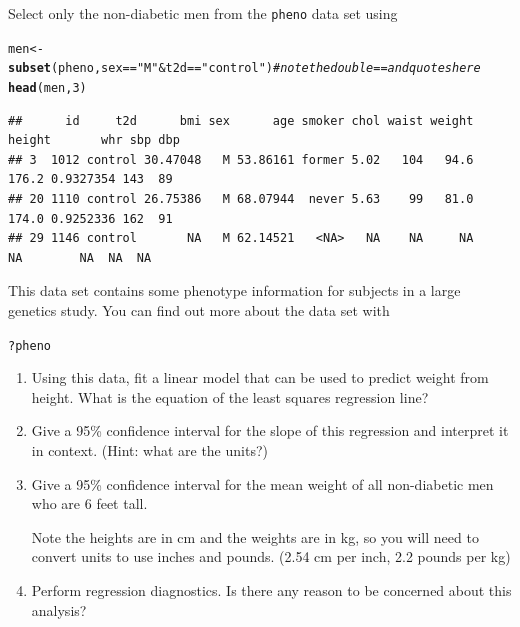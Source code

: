 \documentclass[twoside]{book}\usepackage[]{graphicx}\usepackage[]{xcolor}
\makeatletter
\newcommand{\hlnum}[1]{\textcolor[rgb]{0.686,0.059,0.569}{#1}}%
\newcommand{\hlstr}[1]{\textcolor[rgb]{0.192,0.494,0.8}{#1}}%
\newcommand{\hlcom}[1]{\textcolor[rgb]{0.678,0.584,0.686}{\textit{#1}}}%
\newcommand{\hlopt}[1]{\textcolor[rgb]{0,0,0}{#1}}%
\newcommand{\hlstd}[1]{\textcolor[rgb]{0.345,0.345,0.345}{#1}}%
\newcommand{\hlkwb}[1]{\textcolor[rgb]{0.69,0.353,0.396}{#1}}%
\newcommand{\hlkwd}[1]{\textcolor[rgb]{0.737,0.353,0.396}{\textbf{#1}}}%
\newenvironment{kframe}{%
 \def\at@end@of@kframe{}%
 \ifinner\ifhmode%
  \def\at@end@of@kframe{\end{minipage}}%
  \begin{minipage}{\columnwidth}%
 \fi\fi%
 \def\FrameCommand##1{\hskip\@totalleftmargin \hskip-\fboxsep
 \colorbox{shadecolor}{##1}\hskip-\fboxsep
     \hskip-\linewidth \hskip-\@totalleftmargin \hskip\columnwidth}%
 \MakeFramed {\advance\hsize-\width
   \@totalleftmargin\z@ \linewidth\hsize
   \@setminipage}}%
 {\par\unskip\endMakeFramed%
 \at@end@of@kframe}
\newenvironment{knitrout}{}{} %
\newcommand{\Rindex}[1]{\index{\texttt{#1}}}
\newcommand{\dataframe}[1]{{\color{blue!80!black}\texttt{#1}}\Rindex{#1}}
\makeatother
\begin{document}
\begin{problem}
	Select only the non-diabetic men from the \dataframe{pheno} data set using
\begin{knitrout}
\color{fgcolor}\begin{kframe}
\begin{alltt}
\hlstd{men} \hlkwb{<-} \hlkwd{subset}\hlstd{(pheno, sex} \hlopt{==} \hlstr{"M"} \hlopt{&} \hlstd{t2d} \hlopt{==} \hlstr{"control"}\hlstd{)}  \hlcom{# note the double == and quotes here}
\hlkwd{head}\hlstd{(men,} \hlnum{3}\hlstd{)}
\end{alltt}
\begin{verbatim}
##      id     t2d      bmi sex      age smoker chol waist weight height       whr sbp dbp
## 3  1012 control 30.47048   M 53.86161 former 5.02   104   94.6  176.2 0.9327354 143  89
## 20 1110 control 26.75386   M 68.07944  never 5.63    99   81.0  174.0 0.9252336 162  91
## 29 1146 control       NA   M 62.14521   <NA>   NA    NA     NA     NA        NA  NA  NA
\end{verbatim}
\end{kframe}
\end{knitrout}
This data set contains some phenotype information for subjects in
a large genetics study.  You can find out more about the data set with
\begin{knitrout}
\color{fgcolor}\begin{kframe}
\begin{alltt}
\hlopt{?}\hlstd{pheno}
\end{alltt}
\end{kframe}
\end{knitrout}
\begin{enumerate}
	\item
		Using this data, fit a linear model that can be used 
		to predict weight from height.  What is the equation 
		of the least squares regression line?
	\item
		Give a 95\% confidence interval for the slope of this regression
		and interpret it in context.  (Hint: what are the units?)
	\item
		Give a 95\% confidence interval for the mean weight of all 
		non-diabetic men who are 6 feet tall.  
		
		Note the heights are in cm and the weights are in kg, so you will need to convert 
		units to use inches and pounds.  (2.54 cm per inch, 2.2 pounds per kg)
	\item
		Perform regression diagnostics.  Is there any reason to be concerned
		about this analysis?
\end{enumerate}

\end{problem}
\end{document}
